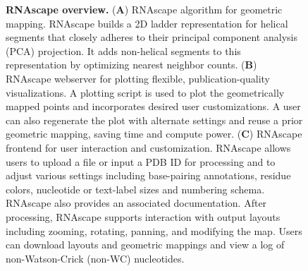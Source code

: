 \begin{center}
    \begin{figure}
        \caption[RNAscape overview.]{\textbf{RNAscape overview.} ({\bf A}) RNAscape algorithm for geometric mapping. RNAscape builds a 2D ladder representation for helical segments that closely adheres to their principal component analysis (PCA) projection. It adds non-helical segments to this representation by optimizing nearest neighbor counts. ({\bf B}) RNAscape webserver for plotting flexible, publication-quality visualizations. A plotting script is used to plot the geometrically mapped points and incorporates desired user customizations. A user can also regenerate the plot with alternate settings and reuse a prior geometric mapping, saving time and compute power. ({\bf C}) RNAscape frontend for user interaction and customization. RNAscape allows users to upload a file or input a PDB ID for processing and to adjust various settings including base-pairing annotations, residue colors, nucleotide or text-label sizes and numbering schema. RNAscape also provides an associated documentation. After processing, RNAscape supports interaction with output layouts including zooming, rotating, panning, and modifying the map. Users can download layouts and geometric mappings and view a log of non-Watson-Crick (non-WC) nucleotides.}
  \label{fig:rnascape2}
\end{figure}
\end{center}

